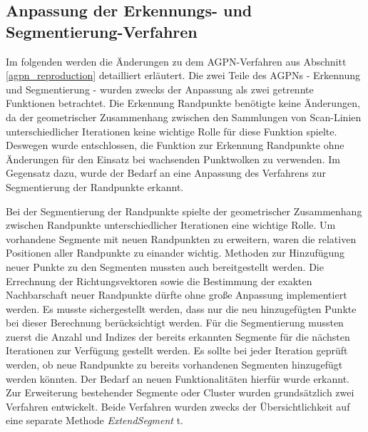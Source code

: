 \subsection{Anpassung der Erkennungs- und Segmentierung-Verfahren}
Im folgenden werden die Änderungen zu dem AGPN-Verfahren aus Abschnitt \ref{agpn_reproduction} detailliert erläutert. Die zwei Teile des AGPNs - Erkennung und Segmentierung - wurden zwecks der Anpassung als zwei getrennte Funktionen betrachtet. Die Erkennung Randpunkte benötigte keine Änderungen, da der geometrischer Zusammenhang zwischen den Sammlungen von Scan-Linien unterschiedlicher Iterationen keine wichtige Rolle für diese Funktion spielte. Deswegen wurde entschlossen, die Funktion zur Erkennung Randpunkte ohne Änderungen für den Einsatz bei wachsenden Punktwolken zu verwenden. Im Gegensatz dazu, wurde der Bedarf an eine Anpassung des Verfahrens zur Segmentierung der Randpunkte erkannt.

Bei der Segmentierung der Randpunkte spielte der geometrischer Zusammenhang zwischen Randpunkte unterschiedlicher Iterationen eine wichtige Rolle. Um vorhandene Segmente mit neuen Randpunkten zu erweitern, waren die relativen Positionen aller Randpunkte zu einander wichtig. Methoden zur Hinzufügung neuer Punkte zu den Segmenten mussten auch bereitgestellt werden. Die Errechnung der Richtungsvektoren sowie die Bestimmung der exakten Nachbarschaft neuer Randpunkte dürfte ohne große Anpassung implementiert werden. Es musste sichergestellt werden, dass nur die neu hinzugefügten Punkte bei dieser Berechnung berücksichtigt werden. Für die Segmentierung mussten zuerst die Anzahl und Indizes der bereits erkannten Segmente für die nächsten Iterationen zur Verfügung gestellt werden. Es sollte bei jeder Iteration geprüft werden, ob neue Randpunkte zu bereits vorhandenen Segmenten hinzugefügt werden könnten. Der Bedarf an neuen Funktionalitäten hierfür wurde erkannt. Zur Erweiterung bestehender Segmente oder Cluster wurden grundsätzlich zwei Verfahren entwickelt. Beide Verfahren wurden zwecks der Übersichtlichkeit auf eine separate Methode \textit{ExtendSegment} t.

